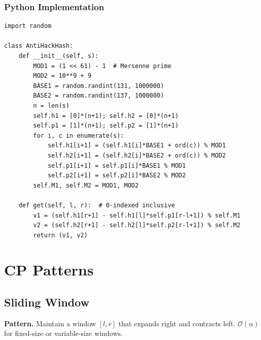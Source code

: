 \documentclass[10pt,a4paper]{article}
\theoremstyle{cpstyle}
\newcommand{\bigO}[1]{\mathcal{O}\!\left(#1\right)}
\begin{document}
\subsubsection{Python Implementation}
\begin{lstlisting}[caption={Anti-hack double hashing for strings}]
import random

class AntiHackHash:
    def __init__(self, s):
        MOD1 = (1 << 61) - 1  # Mersenne prime
        MOD2 = 10**9 + 9
        BASE1 = random.randint(131, 1000000)
        BASE2 = random.randint(137, 1000000)
        n = len(s)
        self.h1 = [0]*(n+1); self.h2 = [0]*(n+1)
        self.p1 = [1]*(n+1); self.p2 = [1]*(n+1)
        for i, c in enumerate(s):
            self.h1[i+1] = (self.h1[i]*BASE1 + ord(c)) % MOD1
            self.h2[i+1] = (self.h2[i]*BASE2 + ord(c)) % MOD2
            self.p1[i+1] = self.p1[i]*BASE1 % MOD1
            self.p2[i+1] = self.p2[i]*BASE2 % MOD2
        self.M1, self.M2 = MOD1, MOD2

    def get(self, l, r):  # 0-indexed inclusive
        v1 = (self.h1[r+1] - self.h1[l]*self.p1[r-l+1]) % self.M1
        v2 = (self.h2[r+1] - self.h2[l]*self.p2[r-l+1]) % self.M2
        return (v1, v2)
\end{lstlisting}

\clearpage
\section{CP Patterns}

\subsection{Sliding Window}

\textbf{Pattern.} Maintain a window $[l, r]$ that expands right and contracts left. $\bigO{n}$ for fixed-size or variable-size windows.
\end{document}
